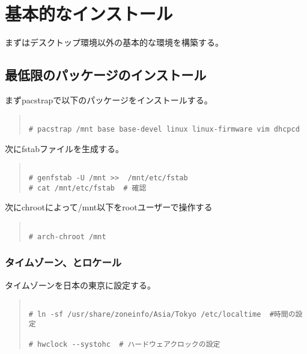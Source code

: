 \documentclass[dvipdfmx]{jsarticle}
\begin{document}
\section{基本的なインストール}

まずはデスクトップ環境以外の基本的な環境を構築する。

\subsection{最低限のパッケージのインストール}

まずpacstrapで以下のパッケージをインストールする。

\begin{quote}
\begin{verbatim}

# pacstrap /mnt base base-devel linux linux-firmware vim dhcpcd

\end{verbatim}
\end{quote}

次にfstabファイルを生成する。

\begin{quote}
\begin{verbatim}

# genfstab -U /mnt >>  /mnt/etc/fstab
# cat /mnt/etc/fstab  # 確認

\end{verbatim}
\end{quote}

次にchrootによって/mnt以下をrootユーザーで操作する

\begin{quote}
\begin{verbatim}

# arch-chroot /mnt

\end{verbatim}
\end{quote}

\subsubsection{タイムゾーン、とロケール}

タイムゾーンを日本の東京に設定する。

\begin{quote}
\begin{verbatim}

# ln -sf /usr/share/zoneinfo/Asia/Tokyo /etc/localtime  #時間の設定

# hwclock --systohc  # ハードウェアクロックの設定

\end{verbatim}
\end{quote}
\end{document}
